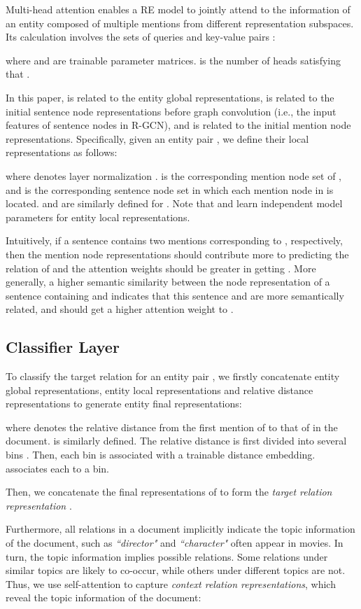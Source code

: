 \documentclass[11pt,a4paper]{article}
\begin{document}
Multi-head attention enables a RE model to jointly attend to the information of an entity composed of multiple mentions from different representation subspaces. Its calculation involves the sets of queries  and key-value pairs :

where  and  are trainable parameter matrices.  is the number of heads satisfying that .

In this paper,  is related to the entity global representations,  is related to the initial sentence node representations before graph convolution (i.e., the input features of sentence nodes in R-GCN), and  is related to the initial mention node representations. 
Specifically, given an entity pair , we define their local representations as follows:
 
where  denotes layer normalization \cite{ba2016layer}.  is the corresponding mention node set of , and  is the corresponding sentence node set in which each mention node in  is located.  and  are similarly defined for . Note that  and  learn independent model parameters for entity local representations.

Intuitively, if a sentence contains two mentions  corresponding to , respectively, then the mention node representations  should contribute more to predicting the relation of  and the attention weights should be greater in getting . More generally, a higher semantic similarity between the node representation of a sentence containing  and  indicates that this sentence and  are more semantically related, and  should get a higher attention weight to .

\subsection{Classifier Layer}

To classify the target relation  for an entity pair , we firstly concatenate entity global representations, entity local representations and relative distance representations to generate entity final representations: 

where  denotes the relative distance from the first mention of  to that of  in the document.  is similarly defined. The relative distance is first divided into several bins . Then, each bin is associated with a trainable distance embedding.  associates each  to a bin.

Then, we concatenate the final representations of  to form the \emph{target relation representation} .

Furthermore, all relations in a document implicitly indicate the topic information of the document, such as \textit{``director"} and \textit{``character"} often appear in movies. In turn, the topic information implies possible relations. Some relations under similar topics are likely to co-occur, while others under different topics are not. Thus, we use self-attention  \cite{sorokin2017context} to capture \emph{context relation representations}, which reveal the topic information of the document:
\end{document}
